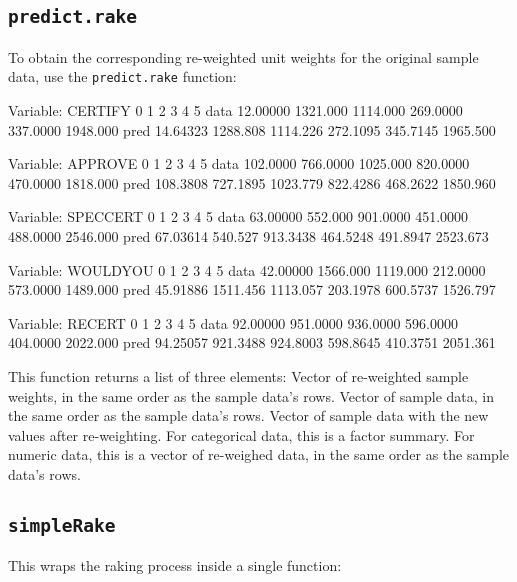 \documentclass[12pt]{TDH-article}
\begin{document}
\subsection{{\tt predict.rake}}
To obtain the corresponding re-weighted unit weights for the original sample data, use the {\tt predict.rake} function:

\begin{Schunk}
\begin{Soutput}
Variable: CERTIFY 
            0        1        2        3        4        5
data 12.00000 1321.000 1114.000 269.0000 337.0000 1948.000
pred 14.64323 1288.808 1114.226 272.1095 345.7145 1965.500

Variable: APPROVE 
            0        1        2        3        4        5
data 102.0000 766.0000 1025.000 820.0000 470.0000 1818.000
pred 108.3808 727.1895 1023.779 822.4286 468.2622 1850.960

Variable: SPECCERT 
            0       1        2        3        4        5
data 63.00000 552.000 901.0000 451.0000 488.0000 2546.000
pred 67.03614 540.527 913.3438 464.5248 491.8947 2523.673

Variable: WOULDYOU 
            0        1        2        3        4        5
data 42.00000 1566.000 1119.000 212.0000 573.0000 1489.000
pred 45.91886 1511.456 1113.057 203.1978 600.5737 1526.797

Variable: RECERT 
            0        1        2        3        4        5
data 92.00000 951.0000 936.0000 596.0000 404.0000 2022.000
pred 94.25057 921.3488 924.8003 598.8645 410.3751 2051.361
\end{Soutput}
\end{Schunk}

This function returns a list of three elements:
\bd
\ti[weight] Vector of re-weighted sample weights, in the same order as the sample data's rows.
\ti[data] Vector of sample data, in the same order as the sample data's rows.
 Vector of sample data with the new values after re-weighting. For categorical data, this is a factor summary. For numeric data, this is a vector of re-weighed data, in the same order as the sample data's rows.
\ed

\subsection{{\tt simpleRake}}
This wraps the raking process inside a single function:
\end{document}
